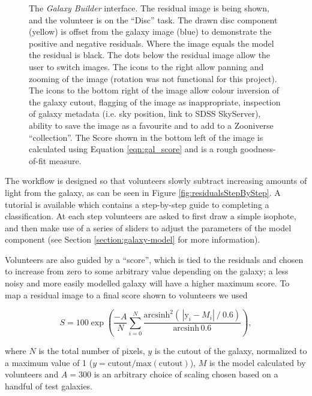 \documentclass[../main.tex]{subfiles}
\begin{document}
\begin{figure}
  \caption{The \textit{Galaxy Builder} interface. The residual image is being shown, and the volunteer is on the ``Disc'' task. The drawn disc component (yellow) is offset from the galaxy image (blue) to demonstrate the positive and negative residuals. Where the image equals the model the residual is black. The dots below the residual image allow the user to switch images. The icons to the right allow panning and zooming of the image (rotation was not functional for this project). The icons to the bottom right of the image allow colour inversion of the galaxy cutout, flagging of the image as inappropriate, inspection of galaxy metadata (i.e. sky position, link to SDSS SkyServer), ability to save the image as a favourite and to add to a Zooniverse ``collection''. The Score shown in the bottom left of the image is calculated using Equation \ref{eqn:gal_score} and is a rough goodness-of-fit measure.}
  \label{fig:interfaceInProgress}
\end{figure}


The workflow is designed so that volunteers slowly subtract increasing amounts of light from the galaxy, as can be seen in Figure \ref{fig:residualsStepByStep}. A tutorial is available which contains a step-by-step guide to completing a classification. At each step volunteers are asked to first draw a simple isophote, and then make use of a series of sliders to adjust the parameters of the model component (see Section \ref{section:galaxy-model} for more information).

Volunteers are also guided by a ``score'', which is tied to the residuals and chosen to increase from zero to some arbitrary value depending on the galaxy; a less noisy and more easily modelled galaxy will have a higher maximum score. To map a residual image to a final score shown to volunteers we used

\begin{equation}
  \label{eqn:gal_score}
    S = 100 \exp\left(\frac{-A}{N}\sum_{i=0}^N\frac{\text{arcsinh}^2\left(\,|\text{y}_i - M_i|\ /\ 0.6\right)}{\text{arcsinh}\,0.6 }\right),
\end{equation}

where $N$ is the total number of pixels, $y$ is the cutout of the galaxy, normalized to a maximum value of 1 ($y = \text{cutout}/\text{max}(\text{cutout})$), $M$ is the model calculated by volunteers and $A=300$ is an arbitrary choice of scaling chosen based on a handful of test galaxies.
\end{document}
